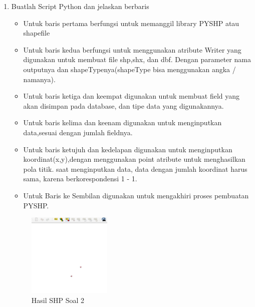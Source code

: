 \begin{enumerate}
	\item Buatlah Script Python dan jelaskan berbaris
	
	\begin{itemize}
		\item Untuk baris pertama berfungsi untuk memanggil library PYSHP atau shapefile
		\item Untuk baris kedua berfungsi untuk menggunakan atribute Writer yang digunakan untuk membuat file shp,shx, dan dbf. \hfill\break Dengan parameter nama outputnya dan shapeTypenya(shapeType bisa menggunakan angka / namanya).
		\item Untuk baris ketiga dan keempat digunakan untuk membuat field yang akan disimpan pada database, dan tipe data yang digunakannya.
		\item Untuk baris kelima dan keenam digunakan untuk menginputkan data,sesuai dengan jumlah fieldnya.
		\item Untuk baris ketujuh dan kedelapan digunakan untuk menginputkan koordinat(x,y),dengan menggunakan point atribute untuk menghasilkan pola titik. \hfill\break
		saat menginputkan data, data dengan jumlah koordinat harus sama, karena berkorespondensi 1 - 1.
		\item Untuk Baris ke Sembilan digunakan untuk mengakhiri proses pembuatan PYSHP.
	\end{itemize}
	\hfill\break
	\begin{figure}[H]
		\includegraphics[width=4cm]{figures/1174095/2/2.png}
		\centering
		\caption{Hasil SHP Soal 2}
	\end{figure}


\end{enumerate}
